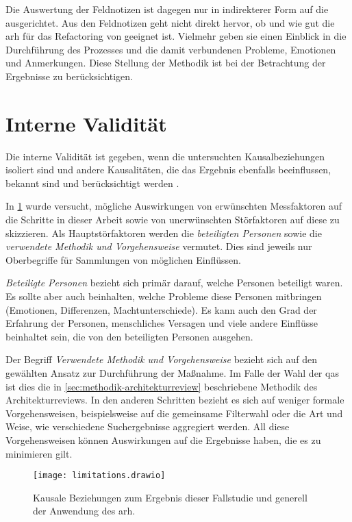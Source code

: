 Die Auswertung der Feldnotizen ist dagegen nur in indirekterer Form auf die \ff ausgerichtet.
Aus den Feldnotizen geht nicht direkt hervor, ob und wie gut die \gls{arh} für das Refactoring von \jf geeignet ist. 
Vielmehr geben sie einen Einblick in die Durchführung des Prozesses und die damit verbundenen Probleme, Emotionen und Anmerkungen. 
Diese Stellung der Methodik ist bei der Betrachtung der Ergebnisse zu berücksichtigen.

\section{Interne Validität}

Die interne Validität ist gegeben, wenn die untersuchten Kausalbeziehungen isoliert sind und andere Kausalitäten, die das Ergebnis ebenfalls beeinflussen, bekannt sind und berücksichtigt werden \cite{Runeson2009}.

In \cref{fig:limitations} wurde versucht, mögliche Auswirkungen von erwünschten Messfaktoren auf die Schritte in dieser Arbeit sowie von unerwünschten Störfaktoren auf diese zu skizzieren.
Als Hauptstörfaktoren werden die \emph{beteiligten Personen} sowie die \emph{verwendete Methodik und Vorgehensweise} vermutet. 
Dies sind jeweils nur Oberbegriffe für Sammlungen von möglichen Einflüssen.

\emph{Beteiligte Personen} bezieht sich primär darauf, welche Personen beteiligt waren.
Es sollte aber auch beinhalten, welche Probleme diese Personen mitbringen (Emotionen, Differenzen, Machtunterschiede).
Es kann auch den Grad der Erfahrung der Personen, menschliches Versagen und viele andere Einflüsse beinhaltet sein, die von den beteiligten Personen ausgehen.

Der Begriff \emph{Verwendete Methodik und Vorgehensweise} bezieht sich auf den gewählten Ansatz zur Durchführung der Maßnahme.
Im Falle der Wahl der \glspl{qa} ist dies die in \cref{sec:methodik-architekturreview} beschriebene Methodik des Architekturreviews.
In den anderen Schritten bezieht es sich auf weniger formale Vorgehensweisen, beispielsweise auf die gemeinsame Filterwahl oder die Art und Weise, wie verschiedene Suchergebnisse aggregiert werden.
All diese Vorgehensweisen können Auswirkungen auf die Ergebnisse haben, die es zu minimieren gilt. 

\begin{figure}
	\centering
	\texttt{[image: limitations.drawio]}
	\caption[Kausale Beziehungen der Fallstudie]{
			Kausale Beziehungen zum Ergebnis dieser Fallstudie und generell der Anwendung des \gls{arh}.
		}
	\label{fig:limitations}
\end{figure}


